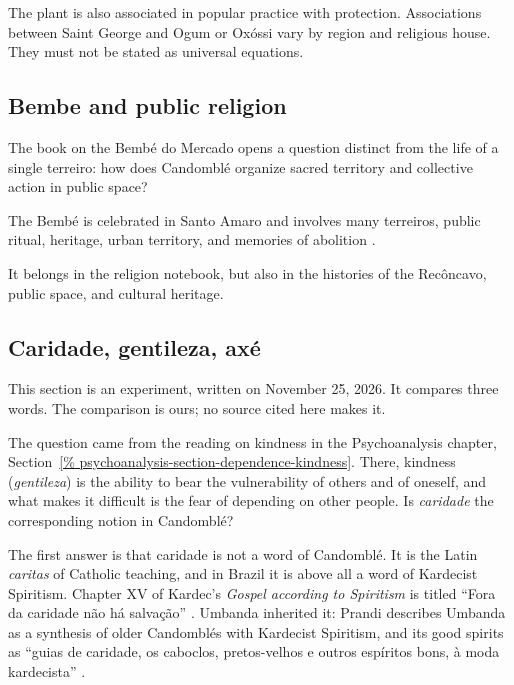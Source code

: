 The plant is also associated in popular
practice with protection.  Associations
between Saint George and Ogum or Ox\'ossi
vary by region and religious house.  They
must not be stated as universal equations.

\subsection{Bembe and public religion}
\label{%
religion-section-bembe-public-religion}

The book on the Bemb\'e do Mercado opens a
question distinct from the life of a single
terreiro: how does Candombl\'e organize
sacred territory and collective action in
public space?

The Bemb\'e is celebrated in Santo Amaro
and involves many terreiros, public ritual,
heritage, urban territory, and memories of
abolition \cite{ufrb2026bembe}.

It belongs in the religion notebook, but
also in the histories of the Rec\^oncavo,
public space, and cultural heritage.

\subsection{Caridade, gentileza, ax\'e}
\label{section-caridade-gentileza-axe}

This section is an experiment, written
on November 25, 2026. It compares three
words. The comparison is ours; no source
cited here makes it.

The question came from the reading on
kindness in the Psychoanalysis chapter,
Section~\ref{%
psychoanalysis-section-dependence-kindness}.
There, kindness (\emph{gentileza}) is the
ability to bear the vulnerability of
others and of oneself, and what makes it
difficult is the fear of depending on
other people. Is \emph{caridade} the
corresponding notion in Candombl\'e?

The first answer is that caridade is not
a word of Candombl\'e. It is the Latin
\emph{caritas} of Catholic teaching, and
in Brazil it is above all a word of
Kardecist Spiritism. Chapter XV of
Kardec's \emph{Gospel according to
Spiritism} is titled ``Fora da caridade
n\~ao h\'a salva\c{c}\~ao''
\cite{kardec-evangelho}. Umbanda
inherited it: Prandi describes Umbanda as
a synthesis of older Candombl\'es with
Kardecist Spiritism, and its good
spirits as ``guias de caridade, os
caboclos, pretos-velhos e outros
espíritos bons, \`a moda kardecista''
\cite{prandi2004axe}.

